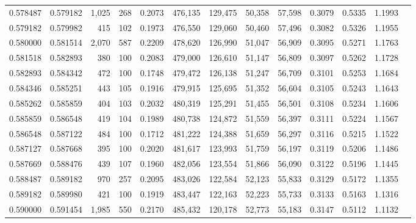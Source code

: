 \begin{tabular}{rrrrrrrrrrrrr}
0.578487 & 0.579182 & 1,025 & 268 &                                     0.2073 & 476,135 & 129,475 &  50,358 &  57,598 & 0.3079 & 0.5335 & 1.1993 \\
0.579182 & 0.579982 &   415 & 102 &                                     0.1973 & 476,550 & 129,060 &  50,460 &  57,496 & 0.3082 & 0.5326 & 1.1955 \\
0.580000 & 0.581514 & 2,070 & 587 &                                     0.2209 & 478,620 & 126,990 &  51,047 &  56,909 & 0.3095 & 0.5271 & 1.1763 \\
0.581518 & 0.582893 &   380 & 100 &                                     0.2083 & 479,000 & 126,610 &  51,147 &  56,809 & 0.3097 & 0.5262 & 1.1728 \\
0.582893 & 0.584342 &   472 & 100 &                                     0.1748 & 479,472 & 126,138 &  51,247 &  56,709 & 0.3101 & 0.5253 & 1.1684 \\
0.584346 & 0.585251 &   443 & 105 &                                     0.1916 & 479,915 & 125,695 &  51,352 &  56,604 & 0.3105 & 0.5243 & 1.1643 \\
0.585262 & 0.585859 &   404 & 103 &                                     0.2032 & 480,319 & 125,291 &  51,455 &  56,501 & 0.3108 & 0.5234 & 1.1606 \\
0.585859 & 0.586548 &   419 & 104 &                                     0.1989 & 480,738 & 124,872 &  51,559 &  56,397 & 0.3111 & 0.5224 & 1.1567 \\
0.586548 & 0.587122 &   484 & 100 &                                     0.1712 & 481,222 & 124,388 &  51,659 &  56,297 & 0.3116 & 0.5215 & 1.1522 \\
0.587127 & 0.587668 &   395 & 100 &                                     0.2020 & 481,617 & 123,993 &  51,759 &  56,197 & 0.3119 & 0.5206 & 1.1486 \\
0.587669 & 0.588476 &   439 & 107 &                                     0.1960 & 482,056 & 123,554 &  51,866 &  56,090 & 0.3122 & 0.5196 & 1.1445 \\
0.588487 & 0.589182 &   970 & 257 &                                     0.2095 & 483,026 & 122,584 &  52,123 &  55,833 & 0.3129 & 0.5172 & 1.1355 \\
0.589182 & 0.589980 &   421 & 100 &                                     0.1919 & 483,447 & 122,163 &  52,223 &  55,733 & 0.3133 & 0.5163 & 1.1316 \\
0.590000 & 0.591454 & 1,985 & 550 &                                     0.2170 & 485,432 & 120,178 &  52,773 &  55,183 & 0.3147 & 0.5112 & 1.1132 \\

\end{tabular}
